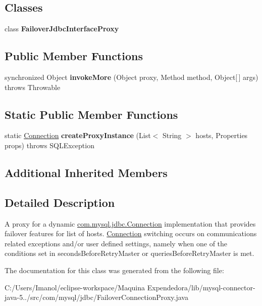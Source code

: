 \subsection*{Classes}
\begin{DoxyCompactItemize}
\item 
class {\bfseries Failover\+Jdbc\+Interface\+Proxy}
\end{DoxyCompactItemize}
\subsection*{Public Member Functions}
\begin{DoxyCompactItemize}
\item 
\mbox{\label{classcom_1_1mysql_1_1jdbc_1_1_failover_connection_proxy_a7a03467d805279c181014efa12d238b0}} 
synchronized Object {\bfseries invoke\+More} (Object proxy, Method method, Object\mbox{[}$\,$\mbox{]} args)  throws Throwable 
\end{DoxyCompactItemize}
\subsection*{Static Public Member Functions}
\begin{DoxyCompactItemize}
\item 
\mbox{\label{classcom_1_1mysql_1_1jdbc_1_1_failover_connection_proxy_a0c24208218fffcb5ef4204af2cea5728}} 
static \mbox{\hyperlink{interfacecom_1_1mysql_1_1jdbc_1_1_connection}{Connection}} {\bfseries create\+Proxy\+Instance} (List$<$ String $>$ hosts, Properties props)  throws S\+Q\+L\+Exception 
\end{DoxyCompactItemize}
\subsection*{Additional Inherited Members}


\subsection{Detailed Description}
A proxy for a dynamic \mbox{\hyperlink{interfacecom_1_1mysql_1_1jdbc_1_1_connection}{com.\+mysql.\+jdbc.\+Connection}} implementation that provides failover features for list of hosts. \mbox{\hyperlink{interfacecom_1_1mysql_1_1jdbc_1_1_connection}{Connection}} switching occurs on communications related exceptions and/or user defined settings, namely when one of the conditions set in \textquotesingle{}seconds\+Before\+Retry\+Master\textquotesingle{} or \textquotesingle{}queries\+Before\+Retry\+Master\textquotesingle{} is met. 

The documentation for this class was generated from the following file\+:\begin{DoxyCompactItemize}
\item 
C\+:/\+Users/\+Imanol/eclipse-\/workspace/\+Maquina Expendedora/lib/mysql-\/connector-\/java-\/5../src/com/mysql/jdbc/Failover\+Connection\+Proxy.\+java\end{DoxyCompactItemize}
